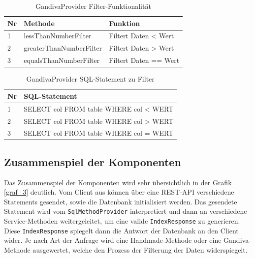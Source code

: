 \begin{table}[H]
\begin{center}
    \begin{tabular}{| l | l | l |}
    \hline
     Nr & Methode & Funktion \\ \hline
    1 & lessThanNumberFilter & Filtert Daten < Wert  \\ \hline
    2 & greaterThanNumberFilter & Filtert Daten > Wert \\ \hline
    3 & equalsThanNumberFilter & Filtert Daten == Wert  \\ \hline
    \end{tabular}
\end{center}
\caption{GandivaProvider Filter-Funktionalität}
\label{GandivaProvider Filter-Funktionalität}
\end{table}

\begin{table}[H]
\begin{center}
    \begin{tabular}{| l | l |}
    \hline
     Nr & SQL-Statement \\ \hline
    1 & SELECT col FROM table WHERE col < WERT  \\ \hline
    2 & SELECT col FROM table WHERE col > WERT  \\ \hline
    3 & SELECT col FROM table WHERE col = WERT   \\ \hline
    \end{tabular}
\end{center}
\caption{GandivaProvider SQL-Statement zu Filter}
\label{GandivaProvider SQL-Statement zu Filter}
\end{table}

\subsection{Zusammenspiel der Komponenten}
Das Zusammenspiel der Komponenten wird sehr übersichtlich in der Grafik \ref{graf_3} deutlich. Vom Client aus können über eine REST-API verschiedene Statements gesendet, sowie die Datenbank initialisiert werden.
Das gesendete Statement wird vom \texttt{SqlMethodProvider} interpretiert und dann an verschiedene Service-Methoden weitergeleitet, um eine valide \texttt{IndexResponse} zu generieren. Diese \texttt{IndexResponse} spiegelt dann die Antwort der Datenbank an den Client wider. Je nach Art der Anfrage wird eine Handmade-Methode oder eine Gandiva-Methode ausgewertet, welche den Prozess der Filterung der Daten widerspiegelt.


